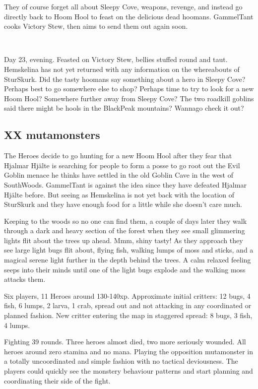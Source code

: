 They of course forget all about Sleepy Cove, weapons, revenge, and instead go directly back to Hoom Hool to feast on the delicious dead hoomans. GammelTant cooks Victory Stew, then aims to send them out again soon.

\

Day 23, evening. Feasted on Victory Stew, bellies stuffed round and taut. Hemskelina has not yet returned with any information on the whereabouts of SturSkurk. Did the tasty hoomans say something about a hero in Sleepy Cove? Perhaps best to go somewhere else to shop? Perhaps time to try to look for a new Hoom Hool? Somewhere further away from Sleepy Cove? The two roadkill goblins said there might be hools in the BlackPeak mountains? Wannago check it out?


\subsection*{XX mutamonsters}

The Heroes decide to go hunting for a new Hoom Hool after they fear that Hjalmar Hjälte is searching for people to form a posse to go root out the Evil Goblin menace he thinks have settled in the old Goblin Cave in the west of SouthWoods. GammelTant is against the idea since they have defeated Hjalmar Hjälte before. But seeing as Hemskelina is not yet back with the location of SturSkurk and they have enough food for a little while she doesn't care much.

Keeping to the woods so no one can find them, a couple of days later they walk through a dark and heavy section of the forest when they see small glimmering lights flit about the trees up ahead. Mmm, shiny tasty! As they approach they see large light bugs flit about, flying fish, walking lumps of moss and sticks, and a magical serene light further in the depth behind the trees. A calm relaxed feeling seeps into their minds until one of the light bugs explode and the walking moss attacks them.

Six players, 11 Heroes around 130-140xp. Approximate initial critters: 12 bugs, 4 fish, 6 lumps, 2 larva, 1 crab, spread out and not attacking in any coordinated or planned fashion. New critter entering the map in staggered spread: 8 bugs, 3 fish, 4 lumps.

Fighting 39 rounds. Three heroes almost died, two more seriously wounded. All heroes around zero stamina and no mana.
Playing the opposition mutamonster in a totally uncoordinated and simple fashion with no tactical deviousness. The players could quickly see the monstery behaviour patterns and start planning and coordinating their side of the fight.

